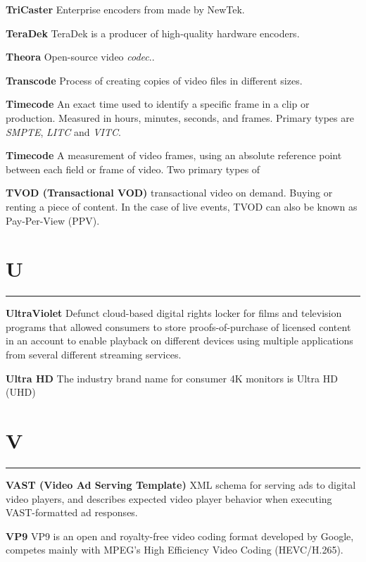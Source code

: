 \smallskip
\textbf{TriCaster}
Enterprise encoders from made by NewTek.

\smallskip
\textbf{TeraDek}
TeraDek is a producer of high-quality hardware encoders.


\smallskip
\textbf{Theora}
Open-source video \textit{codec}..

\smallskip
\textbf{Transcode}
Process of creating copies of video files in different sizes.

\smallskip
\textbf{Timecode}
An exact time used to identify a specific frame in a clip or production. Measured in hours, minutes, seconds, and frames. Primary types are \textit{SMPTE}, \textit{LITC} and \textit{VITC}.

\smallskip
\textbf{Timecode}
A measurement of video frames, using an absolute reference point between each field or frame of video. Two primary types of

\smallskip
\textbf{TVOD (Transactional VOD)}
transactional video on demand. Buying or renting a piece of content. In the case of live events, TVOD can also be known as Pay-Per-View (PPV).


\section{U}
\hrule

\medskip
\textbf{UltraViolet}
Defunct cloud-based digital rights locker for films and television programs that allowed consumers to store proofs-of-purchase of licensed content in an account to enable playback on different devices using multiple applications from several different streaming services.

\smallskip
\textbf{Ultra HD}
The industry brand name for consumer 4K monitors is Ultra HD (UHD)

\section{V}
\hrule

\medskip
\textbf{VAST (Video Ad Serving Template)}
XML schema for serving ads to digital video players, and describes expected video player behavior when executing VAST-formatted ad responses.

\smallskip
\textbf{VP9}
VP9 is an open and royalty-free video coding format developed by Google, competes mainly with MPEG's High Efficiency Video Coding (HEVC/H.265).

